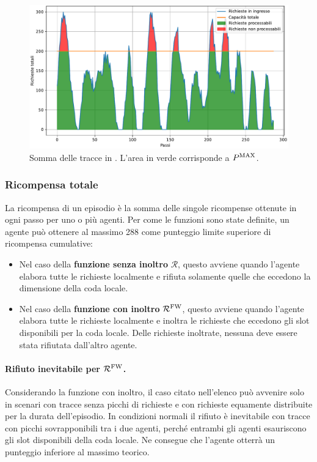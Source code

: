 \begin{figure}
    \centering
    \includegraphics[width=\linewidth]{assets/5/processable_requests_sinusoidal_64423.pdf}
    \caption{Somma delle tracce in . L'area in verde corrisponde a $P^\textnormal{MAX}$.}
    \label{fig:5_processable_requests_synthetic}
\end{figure}

\subsubsection{Ricompensa totale}
\label{sec:5_total_reward}

La ricompensa di un episodio è la somma delle singole ricompense ottenute in ogni passo per uno o più agenti. Per come le funzioni sono state definite, un agente può ottenere al massimo 288 come punteggio limite superiore di ricompensa cumulative:

\begin{itemize}
    \item Nel caso della \textbf{funzione senza inoltro} $\mathcal{R}$, questo avviene quando l'agente elabora tutte le richieste localmente e rifiuta solamente quelle che eccedono la dimensione della coda locale.

    \item Nel caso della \textbf{funzione con inoltro} $\mathcal{R}^\textnormal{FW}$, questo avviene quando l'agente elabora tutte le richieste localmente e inoltra le richieste che eccedono gli slot disponibili per la coda locale. Delle richieste inoltrate, nessuna deve essere stata rifiutata dall'altro agente.
\end{itemize}

\paragraph{Rifiuto inevitabile per $\mathcal{R}^\textnormal{FW}$.} Considerando la funzione con inoltro, il caso citato nell'elenco può avvenire solo in scenari con tracce senza picchi di richieste e con richieste equamente distribuite per la durata dell'episodio. In condizioni normali il rifiuto è inevitabile con tracce con picchi sovrapponibili tra i due agenti, perché entrambi gli agenti esauriscono gli slot disponibili della coda locale. Ne consegue che l'agente otterrà un punteggio inferiore al massimo teorico.

